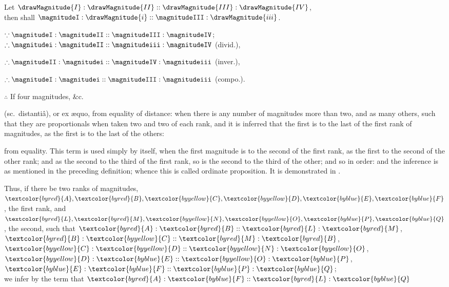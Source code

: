 \documentclass{byrne-book}
\begin{document}
\begin{center}
Let $\drawMagnitude{I} : \drawMagnitude{II} :: \drawMagnitude{III} : \drawMagnitude{IV}$,\\
then shall $\magnitudeI : \drawMagnitude{i} :: \magnitudeIII : \drawMagnitude{iii}$.

$\because \magnitudeI : \magnitudeII :: \magnitudeIII : \magnitudeIV$;\\ %
$\therefore \magnitudei : \magnitudeII :: \magnitudeiii : \magnitudeIV$ (divid.), %

$\therefore \magnitudeII : \magnitudei :: \magnitudeIV : \magnitudeiii$ (inver.),

$\therefore \magnitudeI : \magnitudei :: \magnitudeIII : \magnitudeiii$ (compo.).

$\therefore$ If four magnitudes, \&c.
\end{center}


\label{def:V.XVIII} 
 (sc.\ distantiâ), or ex \ae quo, from equality of distance: when there is any number of magnitudes more than two, and as many others, such that they are proportionals when taken two and two of each rank, and it is inferred that the first is to the last of the first rank of magnitudes, as the first is to the last of the others: 

\vfill\pagebreak

\label{def:V.XIX} 
\def\varA{\textcolor{byred}{A}}
\def\varB{\textcolor{byred}{B}}
\def\varC{\textcolor{byyellow}{C}}
\def\varD{\textcolor{byyellow}{D}}
\def\varE{\textcolor{byblue}{E}}
\def\varF{\textcolor{byblue}{F}}
\def\varL{\textcolor{byred}{L}}
\def\varM{\textcolor{byred}{M}}
\def\varN{\textcolor{byyellow}{N}}
\def\varO{\textcolor{byyellow}{O}}
\def\varP{\textcolor{byblue}{P}}
\def\varQ{\textcolor{byblue}{Q}}
 from equality. This term is used simply by itself, when the first magnitude is to the second of the first rank, as the first to the second of the other rank; and as the second to the third of the first rank, so is the second to the third of the other; and so in order: and the inference is as mentioned in the preceding definition; whence this is called ordinate proposition. It is demonstrated in .

\begin{center}
Thus, if there be two ranks of magnitudes,\\
$\varA, \varB, \varC, \varD, \varE, \varF$, the first rank,
and $\varL, \varM, \varN, \varO, \varP, \varQ$, the second,
such that $\varA : \varB :: \varL : \varM$, $\varB : \varC :: \varM : \varB$, $\varC : \varD :: \varN : \varO$, $\varD : \varE :: \varO : \varP$, $\varE : \varF :: \varP : \varQ$;\\
we infer by the term  that $\varA : \varF :: \varL : \varQ$
\end{center}
\end{document}
